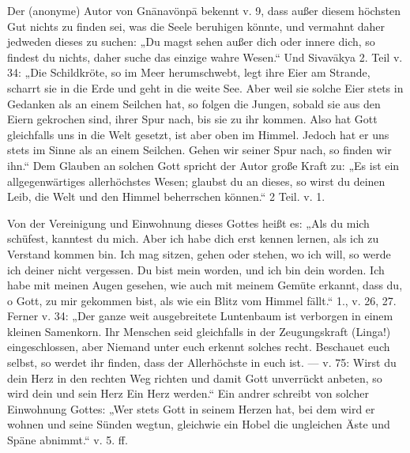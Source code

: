 \documentclass{article}
\begin{document}
Der (anonyme) Autor von Gn\={a}navönp\={a} bekennt v. 9, dass außer diesem höchsten Gut nichts zu finden sei, was die Seele beruhigen könnte, und vermahnt daher jedweden dieses zu suchen: „Du magst sehen außer dich oder innere dich, so findest du nichts, daher suche das einzige wahre Wesen.“ Und Sivav\={a}kya 2. Teil v. 34: „Die Schildkröte, so im Meer herumschwebt, legt ihre Eier am Strande, scharrt sie in die Erde und geht in die weite See. Aber weil sie solche Eier stets in Gedanken als an einem Seilchen hat, so folgen die Jungen, sobald sie aus den Eiern gekrochen sind, ihrer Spur nach, bis sie zu ihr kommen. Also hat Gott gleichfalls uns in die Welt gesetzt, ist aber oben im Himmel. Jedoch hat er uns stets im Sinne als an einem Seilchen. Gehen wir seiner Spur nach, so finden wir ihn.“ Dem Glauben an solchen Gott spricht der Autor große Kraft zu: „Es ist ein allgegenwärtiges allerhöchstes Wesen; glaubst du an dieses, so wirst du deinen Leib, die Welt und den Himmel beherrschen können.“ 2 Teil. v. 1.

Von der Vereinigung und Einwohnung dieses Gottes heißt es: „Als du mich schüfest, kanntest du mich. Aber ich habe dich erst kennen lernen, als ich zu Verstand kommen bin. Ich mag sitzen, gehen oder stehen, wo ich will, so werde ich deiner nicht vergessen. Du bist mein worden, und ich bin dein worden. Ich habe mit meinen Augen gesehen, wie auch mit meinem Gemüte erkannt, dass du, o Gott, zu mir gekommen bist, als wie ein Blitz vom Himmel fällt.“ 1., v. 26, 27. Ferner v. 34: „Der ganze weit ausgebreitete Luntenbaum ist verborgen in einem kleinen Samenkorn. Ihr Menschen seid gleichfalls in der Zeugungskraft (Linga!) eingeschlossen, aber Niemand unter euch erkennt solches recht. Beschauet euch selbst, so werdet ihr finden, dass der Allerhöchste in euch ist. — v. 75: Wirst du dein Herz in den rechten Weg richten und damit Gott unverrückt anbeten, so wird dein und sein Herz Ein Herz werden.“ Ein andrer schreibt von solcher Einwohnung Gottes: „Wer stets Gott in seinem Herzen hat, bei dem wird er wohnen und seine Sünden wegtun, gleichwie ein Hobel die ungleichen Äste und Späne abnimmt.“ v. 5. ff.
\end{document}
